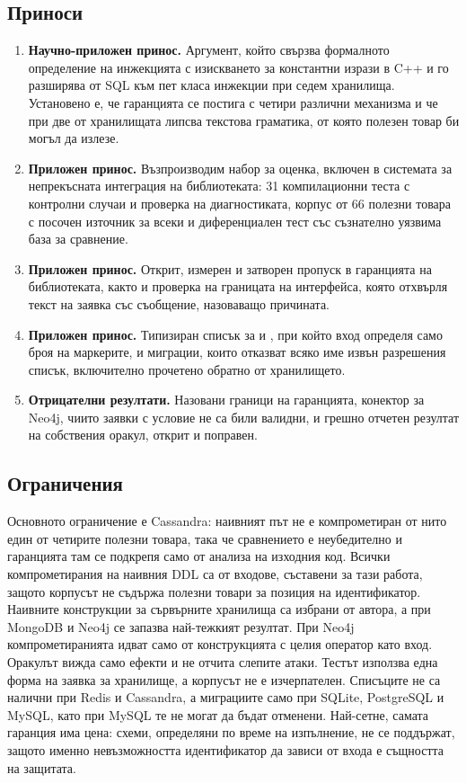 \subsection*{Приноси}

\begin{enumerate}
    \item \textbf{Научно-приложен принос.} Аргумент, който свързва формалното
          определение на инжекцията с изискването за константни изрази в C++ и
          го разширява от SQL към пет класа инжекции при седем хранилища.
          Установено е, че гаранцията се постига с четири различни механизма и
          че при две от хранилищата липсва текстова граматика, от която полезен
          товар би могъл да излезе.
    \item \textbf{Приложен принос.} Възпроизводим набор за оценка, включен в
          системата за непрекъсната интеграция на библиотеката: 31 компилационни
          теста с контролни случаи и проверка на диагностиката, корпус от 66
          полезни товара с посочен източник за всеки и диференциален тест със
          съзнателно уязвима база за сравнение.
    \item \textbf{Приложен принос.} Открит, измерен и затворен пропуск в
          гаранцията на библиотеката, както и проверка на границата на
          интерфейса, която отхвърля текст на заявка със съобщение, назоваващо
          причината.
    \item \textbf{Приложен принос.} Типизиран списък за  и ,
          при който вход определя само броя на маркерите, и миграции, които
          отказват всяко име извън разрешения списък, включително прочетено
          обратно от хранилището.
    \item \textbf{Отрицателни резултати.} Назовани граници на гаранцията, конектор
          за Neo4j, чиито заявки с условие не са били валидни, и грешно отчетен
          резултат на собствения оракул, открит и поправен.
\end{enumerate}

\subsection*{Ограничения}

Основното ограничение е Cassandra: наивният път не е компрометиран от нито един от
четирите полезни товара, така че сравнението е неубедително и гаранцията там се
подкрепя само от анализа на изходния код. Всички компрометирания на наивния DDL са
от входове, съставени за тази работа, защото корпусът не съдържа полезни товари за
позиция на идентификатор. Наивните конструкции за сървърните хранилища са избрани
от автора, а при MongoDB и Neo4j се запазва най-тежкият резултат. При Neo4j
компрометиранията идват само от конструкцията с целия оператор като вход. Оракулът вижда
само ефекти и не отчита слепите атаки. Тестът използва една форма на заявка за
хранилище, а корпусът не е изчерпателен. Списъците не са налични при Redis и
Cassandra, а миграциите само при SQLite, PostgreSQL и MySQL, като при MySQL те не
могат да бъдат отменени.
Най-сетне, самата гаранция има цена: схеми, определяни по време на изпълнение, не
се поддържат, защото именно невъзможността идентификатор да зависи от входа е
същността на защитата.

